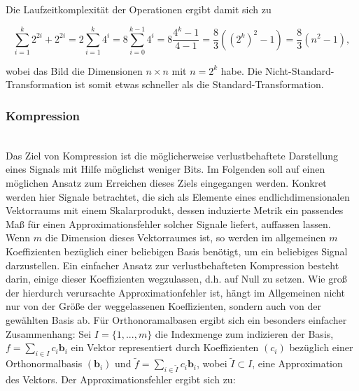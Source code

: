 \documentclass{article}
\begin{document}
\noindent Die Laufzeitkomplexität der Operationen ergibt damit sich zu 

\[
\sum_{i=1}^k 2^{2i} + 2^{2i} 
= 2\sum_{i=1}^k 4^i 
= 8\sum_{i=0}^{k-1} 4^i 
= 8\frac{4^k-1}{4-1} 
= \frac{8}{3}((2^k)^2-1) 
= \frac{8}{3}(n^2-1) ,
\]

\noindent wobei das Bild die Dimensionen $n \times n$ mit $n=2^k$ habe. Die Nicht-Standard-Transformation ist somit etwas schneller als die Standard-Transformation.

\subsubsection{Kompression}~\\
 

Das Ziel von Kompression ist die möglicherweise verlustbehaftete Darstellung eines Signals mit Hilfe möglichst weniger Bits. Im Folgenden soll auf einen möglichen Ansatz zum Erreichen dieses Ziels eingegangen werden.
Konkret werden hier Signale betrachtet, die sich als Elemente eines endlichdimensionalen Vektorraums mit einem Skalarprodukt, dessen induzierte Metrik ein passendes Maß für einen Approximationsfehler solcher Signale liefert, auffassen lassen. Wenn $m$ die Dimension dieses Vektorraumes ist, so werden im allgemeinen $m$ Koeffizienten bezüglich einer beliebigen Basis benötigt, um ein beliebiges Signal darzustellen. Ein einfacher Ansatz zur verlustbehafteten Kompression besteht darin, einige dieser Koeffizienten wegzulassen, d.h. auf Null zu setzen. Wie groß der hierdurch verursachte Approximationfehler ist, hängt im Allgemeinen nicht nur von der Größe der weggelassenen Koeffizienten, sondern auch von der gewählten Basis ab. Für Orthonoramalbasen ergibt sich ein besonders einfacher Zusammenhang: Sei $I=\{1,...,m\}$ die Indexmenge zum indizieren der Basis, $f=\sum_{i \in I} c_i \mathbf{b}_i$ ein Vektor representiert durch Koeffizienten $(c_i)$ bezüglich einer Orthonormalbasis $(\mathbf{b}_i)$ und $\tilde{f}=\sum_{i \in \tilde{I}} c_i \mathbf{b}_i$, wobei $\tilde{I} \subset I$, eine Approximation des Vektors. Der Approximationsfehler ergibt sich zu:
\end{document}
